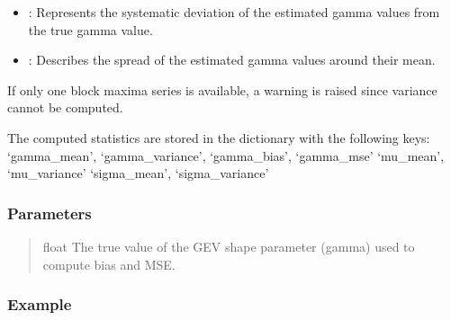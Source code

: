 \documentclass[a4paper,11pt,openany,english]{sphinxmanual}
\begin{document}
\begin{fulllineitems}
\begin{fulllineitems}
\begin{itemize}
\item {} 
\sphinxAtStartPar
{}: Represents the systematic deviation of the estimated gamma values from the true gamma value.

\item {} 
\sphinxAtStartPar
{}: Describes the spread of the estimated gamma values around their mean.

\end{itemize}

\sphinxAtStartPar
If only one block maxima series is available, a warning is raised since variance cannot be computed.

\sphinxAtStartPar
The computed statistics are stored in the  dictionary with the following keys:
\sphinxhyphen{} ‘gamma\_mean’, ‘gamma\_variance’, ‘gamma\_bias’, ‘gamma\_mse’
\sphinxhyphen{} ‘mu\_mean’, ‘mu\_variance’
\sphinxhyphen{} ‘sigma\_mean’, ‘sigma\_variance’


\subsubsection{Parameters}
\label{\detokenize{api_topt:id37}}\begin{quote}\begin{description}
\sphinxAtStartPar
float
The true value of the GEV shape parameter (gamma) used to compute bias and MSE.

\end{description}\end{quote}


\subsubsection{Example}
\label{\detokenize{api_topt:id38}}
\begin{sphinxVerbatim}[commandchars=\\\{\}]
  
\end{sphinxVerbatim}



\end{fulllineitems}
\end{fulllineitems}
\end{document}
